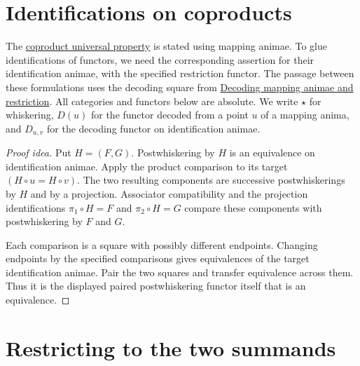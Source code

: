\documentclass[11pt]{article}
\begin{document}
\section*{Identifications on coproducts}

The \href{initial-categories-and-coproducts.html}{coproduct universal property} is stated using
mapping animae. To glue identifications of functors, we need the
corresponding assertion for their identification animae, with the
specified restriction functor. The passage between these formulations
uses the decoding square from
\href{supplementary-decoding-and-restriction.html}{Decoding mapping animae and restriction}.
All categories and functors below are absolute. We write $\star$ for
whiskering, $D(u)$ for the functor decoded from a point $u$ of a mapping
anima, and $D_{u,v}$ for the decoding functor on identification animae.

\begin{proof}[Proof idea]
Put $H=(F,G)$. Postwhiskering by $H$ is an equivalence on identification
animae. Apply the product comparison to its target $(H\circ u=H\circ v)$.
The two resulting components are successive postwhiskerings by $H$ and
by a projection. Associator compatibility and the projection
identifications $\pi_1\circ H=F$ and $\pi_2\circ H=G$ compare these
components with postwhiskering by $F$ and $G$.

Each comparison is a square with possibly different endpoints. Changing
endpoints by the specified comparisons gives equivalences of the target
identification animae. Pair the two squares and transfer equivalence
across them. Thus it is the displayed paired postwhiskering functor
itself that is an equivalence.
\end{proof}

\section*{Restricting to the two summands}
\end{document}
